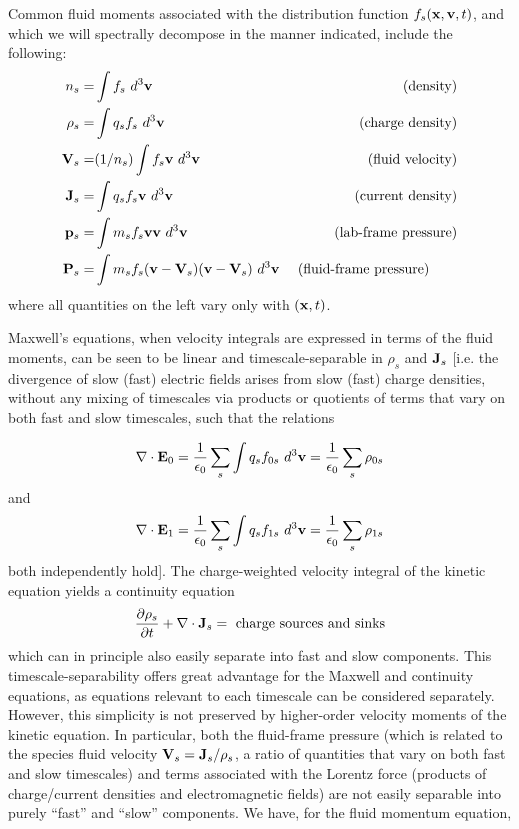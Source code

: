 Common fluid moments associated with the distribution function $f_{s}({\bf x},{\bf v},t)$, and
which we will spectrally decompose in the manner indicated, include the following:
\begin{eqnarray}
n_{s} = & \int f_{s}~d^{3}{\bf v} & \mbox{~(density)} \\
\rho_{s} = & \int q_{s} f_{s}~d^{3}{\bf v} & \mbox{~(charge density)} \\
{\bf V}_{s} = & (1/n_{s}) \int f_{s} {\bf v}~d^{3}{\bf v} & \mbox{~(fluid velocity)} \\
{\bf J}_{s} = & \int q_{s} f_{s} {\bf v}~d^{3}{\bf v} & \mbox{~(current density)} \\
{\mathbf p}_{s} = & \int m_{s} f_{s} {\bf v} {\bf v}~d^{3}{\bf v} & 
\mbox{~(lab-frame pressure)} \\
{\mathbf P}_{s} = & \int m_{s} f_{s} ({\bf v} - {\bf V}_{s})({\bf v} - {\bf V}_{s})~d^{3}{\bf v} & 
\mbox{~(fluid-frame pressure) ~~~~~} 
\end{eqnarray}
where all quantities on the left vary only with $({\bf x},t)$. 

Maxwell's equations, when velocity integrals are expressed in terms of the fluid
moments, can be seen to be linear and timescale-separable in $\rho_{s}$ and ${\bf J}_{s}$ 
[i.e. the divergence of slow (fast) electric fields arises from slow (fast) charge 
densities, without any mixing of timescales via products or quotients of terms that vary on both fast and 
slow timescales, such that the relations

\begin{equation}
\nabla \cdot {\bf E}_{0} = {1 \over \epsilon_{0}} \sum_{s} \int q_{s} f_{0s}~d^{3}{\bf v}
= {1 \over \epsilon_{0}} \sum_{s} \rho_{0s}
\end{equation}
and
\begin{equation}
\nabla \cdot {\bf E}_{1} = {1 \over \epsilon_{0}} \sum_{s} \int q_{s} f_{1s}~d^{3}{\bf v}
= {1 \over \epsilon_{0}} \sum_{s} \rho_{1s}
\end{equation}
both independently hold].  The charge-weighted velocity integral of the kinetic equation yields a
continuity equation
\begin{equation}
{\partial \rho_{s} \over \partial t} + \nabla \cdot {\bf J}_{s} = \mbox{~charge sources and sinks}
\end{equation}
which can in principle also easily separate into fast and slow components.
This timescale-separability offers great advantage for the Maxwell and continuity equations,
as equations relevant to each timescale can be considered separately.  However, this 
simplicity is not preserved by higher-order velocity moments of the kinetic equation.
In particular, both the fluid-frame pressure (which is related to the 
species fluid velocity ${\bf V}_{s} = {\bf J}_{s}/\rho_{s}$, a ratio of quantities that vary on both
fast and slow timescales) and terms associated with the Lorentz force (products of charge/current
densities and electromagnetic fields) are not easily separable into purely ``fast'' and ``slow''
components.  We have, for the fluid momentum equation,

